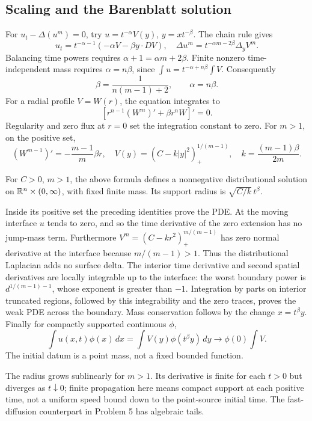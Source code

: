\Needspace{35mm}
\subsection{Scaling and the Barenblatt solution}\label{sec:4-barenblatt}
For $u_t-\Delta(u^m)=0$, try $u=t^{-\alpha}V(y)$,
$y=xt^{-\beta}$. The chain rule gives
\[
 u_t=t^{-\alpha-1}(-\alpha V-\beta y\cdot DV),\quad
 \Delta u^m=t^{-\alpha m-2\beta}\Delta_yV^m .
\]
Balancing time powers requires $\alpha+1=\alpha m+2\beta$.
Finite nonzero time-independent mass requires $\alpha=n\beta$,
since $\int u=t^{-\alpha+n\beta}\int V$.
Consequently
\[
 \beta=\frac1{n(m-1)+2},\qquad \alpha=n\beta.
\]
For a radial profile $V=W(r)$, the equation integrates to
\[
 [r^{n-1}(W^m)'+\beta r^nW]'=0 .
\]
Regularity and zero flux at $r=0$ set the integration constant to zero.
For $m>1$, on the positive set,
\[
 (W^{m-1})'=-\frac{m-1}{m}\beta r,\quad
 V(y)=(C-k|y|^2)_+^{1/(m-1)},\quad
 k=\frac{(m-1)\beta}{2m}.
\]
\begin{theorem}
For $C>0$, $m>1$, the above formula defines a nonnegative
distributional solution on $\mathbb{R}^n\times(0,\infty)$, with fixed finite mass.
Its support radius is $\sqrt{C/k}\,t^\beta$.
\end{theorem}
\begin{expandedproof}
Inside its positive set the preceding identities prove the PDE.
At the moving interface $u$ tends to zero, and so the time derivative
of the zero extension has no jump-mass term.
Furthermore $V^m=(C-kr^2)_+^{m/(m-1)}$ has zero normal derivative
at the interface because $m/(m-1)>1$.
Thus the distributional Laplacian adds no surface delta.
The interior time derivative and second spatial derivatives are
locally integrable up to the interface: the worst boundary power
is $d^{1/(m-1)-1}$, whose exponent is greater than $-1$.
Integration by parts on interior truncated regions, followed by this
integrability and the zero traces, proves the weak PDE across the boundary.
Mass conservation follows by the change $x=t^\beta y$.
Finally for compactly supported continuous $\phi$,
\[
 \int u(x,t)\phi(x)\,dx=\int V(y)\phi(t^\beta y)\,dy
 \longrightarrow \phi(0)\int V .
\]
The initial datum is a point mass, not a fixed bounded function.
\end{expandedproof}
\Needspace{45mm}
The radius grows sublinearly for $m>1$.
Its derivative is finite for each $t>0$ but diverges as $t\downarrow0$;
finite propagation here means compact support at each positive time,
not a uniform speed bound down to the point-source initial time.
The fast-diffusion counterpart in Problem 5 has algebraic tails.
